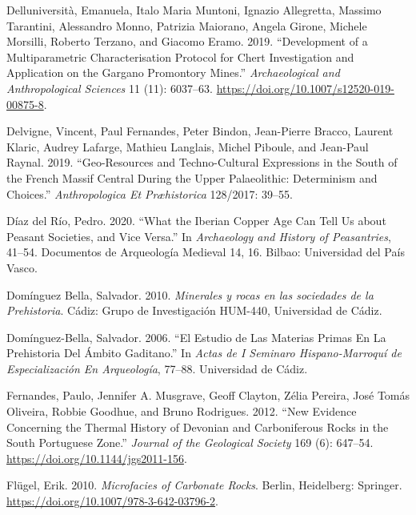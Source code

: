 \documentclass[
  a4paper,
  DIV=11,
  numbers=noendperiod]{scrreprt}
\newlength{\cslhangindent}
\newenvironment{CSLReferences}[2] %
 {\begin{list}{}{%
  \setlength{\itemindent}{0pt}
  \setlength{\leftmargin}{0pt}
  \setlength{\parsep}{0pt}
  \ifodd #1
   \setlength{\leftmargin}{\cslhangindent}
   \setlength{\itemindent}{-1\cslhangindent}
  \fi
  \setlength{\itemsep}{#2\baselineskip}}}
 {\end{list}}
\begin{document}
\begin{CSLReferences}{1}{0}
Delluniversità, Emanuela, Italo Maria Muntoni, Ignazio Allegretta,
Massimo Tarantini, Alessandro Monno, Patrizia Maiorano, Angela Girone,
Michele Morsilli, Roberto Terzano, and Giacomo Eramo. 2019.
{``Development of a Multiparametric Characterisation Protocol for Chert
Investigation and Application on the {Gargano Promontory} Mines.''}
\emph{Archaeological and Anthropological Sciences} 11 (11): 6037--63.
\url{https://doi.org/10.1007/s12520-019-00875-8}.

Delvigne, Vincent, Paul Fernandes, Peter Bindon, Jean-Pierre Bracco,
Laurent Klaric, Audrey Lafarge, Mathieu Langlais, Michel Piboule, and
Jean-Paul Raynal. 2019. {``Geo-Resources and Techno-Cultural Expressions
in the South of the {French Massif Central} During the {Upper
Palaeolithic}: Determinism and Choices.''} \emph{Anthropologica Et
Pr{æ}historica} 128/2017: 39--55.

Díaz del Río, Pedro. 2020. {``What the {Iberian Copper Age} Can Tell Us
about Peasant Societies, and Vice Versa.''} In \emph{Archaeology and
History of Peasantries}, 41--54. Documentos de Arqueolog{í}a Medieval
14, 16. Bilbao: Universidad del Pa{í}s Vasco.

Domínguez Bella, Salvador. 2010. \emph{{Minerales y rocas en las
sociedades de la Prehistoria}}. C{á}diz: Grupo de Investigaci{ó}n
HUM-440, Universidad de C{á}diz.

Domínguez-Bella, Salvador. 2006. {``El Estudio de Las Materias Primas En
La {Prehistoria} Del {Á}mbito Gaditano.''} In \emph{Actas de {I Seminaro
Hispano-Marroqu{í}} de Especializaci{ó}n En Arqueolog{í}a}, 77--88.
Universidad de C{á}diz.

Fernandes, Paulo, Jennifer A. Musgrave, Geoff Clayton, Zélia Pereira,
José Tomás Oliveira, Robbie Goodhue, and Bruno Rodrigues. 2012. {``New
Evidence Concerning the Thermal History of {Devonian} and
{Carboniferous} Rocks in the {South Portuguese Zone}.''} \emph{Journal
of the Geological Society} 169 (6): 647--54.
\url{https://doi.org/10.1144/jgs2011-156}.

Flügel, Erik. 2010. \emph{Microfacies of {Carbonate Rocks}}. Berlin,
Heidelberg: Springer. \url{https://doi.org/10.1007/978-3-642-03796-2}.


\end{CSLReferences}
\end{document}
